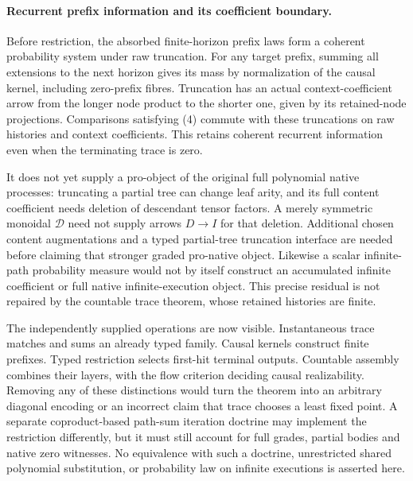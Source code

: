 \documentclass[11pt]{article}
\begin{document}
\paragraph{Recurrent prefix information and its coefficient boundary.}
Before restriction, the absorbed finite-horizon prefix laws form a coherent probability system under raw truncation. For any target prefix, summing all extensions to the next horizon gives its mass by normalization of the causal kernel, including zero-prefix fibres. Truncation has an actual context-coefficient arrow from the longer node product to the shorter one, given by its retained-node projections. Comparisons satisfying (4) commute with these truncations on raw histories and context coefficients. This retains coherent recurrent information even when the terminating trace is zero.

It does not yet supply a pro-object of the original full polynomial native processes: truncating a partial tree can change leaf arity, and its full content coefficient needs deletion of descendant tensor factors. A merely symmetric monoidal $\mathcal D$ need not supply arrows $D\to I$ for that deletion. Additional chosen content augmentations and a typed partial-tree truncation interface are needed before claiming that stronger graded pro-native object. Likewise a scalar infinite-path probability measure would not by itself construct an accumulated infinite coefficient or full native infinite-execution object. This precise residual is not repaired by the countable trace theorem, whose retained histories are finite.

The independently supplied operations are now visible. Instantaneous trace matches and sums an already typed family. Causal kernels construct finite prefixes. Typed restriction selects first-hit terminal outputs. Countable assembly combines their layers, with the flow criterion deciding causal realizability. Removing any of these distinctions would turn the theorem into an arbitrary diagonal encoding or an incorrect claim that trace chooses a least fixed point. A separate coproduct-based path-sum iteration doctrine may implement the restriction differently, but it must still account for full grades, partial bodies and native zero witnesses. No equivalence with such a doctrine, unrestricted shared polynomial substitution, or probability law on infinite executions is asserted here.
\end{document}
